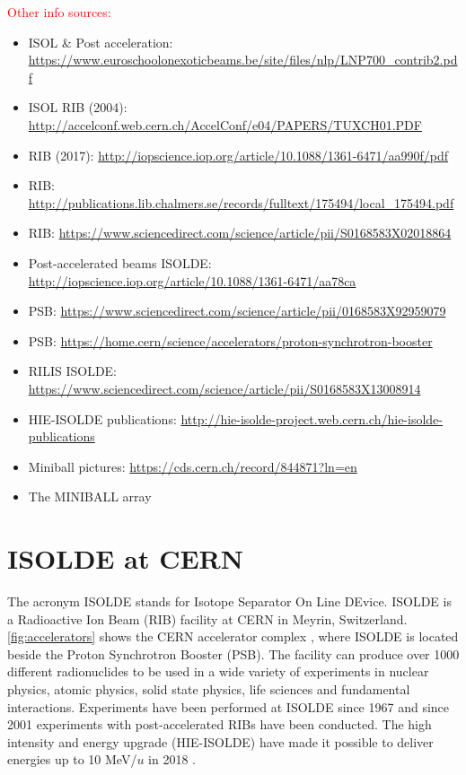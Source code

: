 \documentclass[twoside,english]{uiofysmaster/uiofysmaster}
\begin{document}
\textcolor{red}{Other info sources:}
\begin{itemize}
	\item ISOL \& Post acceleration: \url{https://www.euroschoolonexoticbeams.be/site/files/nlp/LNP700_contrib2.pdf}
	\item ISOL RIB (2004): \url{http://accelconf.web.cern.ch/AccelConf/e04/PAPERS/TUXCH01.PDF}
	\item RIB (2017): \url{http://iopscience.iop.org/article/10.1088/1361-6471/aa990f/pdf}
	\item RIB: \url{http://publications.lib.chalmers.se/records/fulltext/175494/local_175494.pdf}
	\item RIB: \url{https://www.sciencedirect.com/science/article/pii/S0168583X02018864}
	\item Post-accelerated beams ISOLDE: \url{http://iopscience.iop.org/article/10.1088/1361-6471/aa78ca}
	\item PSB: \url{https://www.sciencedirect.com/science/article/pii/0168583X92959079}
	\item PSB: \url{https://home.cern/science/accelerators/proton-synchrotron-booster}
	\item RILIS ISOLDE: \url{https://www.sciencedirect.com/science/article/pii/S0168583X13008914}
	\item HIE-ISOLDE publications: \url{http://hie-isolde-project.web.cern.ch/hie-isolde-publications}
	\item Miniball pictures: \url{https://cds.cern.ch/record/844871?ln=en}
	\item The MINIBALL array \cite{MBarray}
\end{itemize}



\section{ISOLDE at CERN}
The acronym ISOLDE stands for Isotope Separator On Line DEvice. ISOLDE is a Radioactive Ion Beam (RIB) facility at CERN in Meyrin, Switzerland.  \autoref{fig:accelerators} shows the CERN accelerator complex \cite{CERN-AC}, where ISOLDE is located beside the Proton Synchrotron Booster (PSB). The facility can produce over 1000 different radionuclides to be used in a wide variety of experiments in nuclear physics, atomic physics, solid state physics, life sciences and fundamental interactions. Experiments have been performed at ISOLDE since 1967 and since 2001 experiments with post-accelerated RIBs have been conducted. The high intensity and energy upgrade (HIE-ISOLDE) have made it possible to deliver energies up to 10 MeV/$u$ in 2018 \cite{HIE-ISOLDE, ISOLDE-web, ISOLDE-facility}. 
\end{document}
